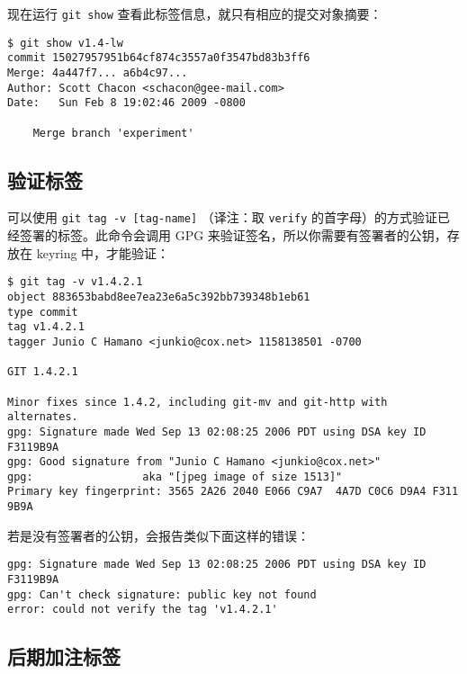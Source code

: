 \documentclass[a4paper]{book}
\begin{document}
现在运行 \texttt{git show} 查看此标签信息，就只有相应的提交对象摘要：

\begin{shaded}\begin{verbatim}
$ git show v1.4-lw
commit 15027957951b64cf874c3557a0f3547bd83b3ff6
Merge: 4a447f7... a6b4c97...
Author: Scott Chacon <schacon@gee-mail.com>
Date:   Sun Feb 8 19:02:46 2009 -0800

    Merge branch 'experiment'
\end{verbatim}\end{shaded}

\subsection{验证标签}

可以使用 \texttt{git tag -v {[}tag-name{]}} （译注：取 \texttt{verify} 的首字母）的方式验证已经签署的标签。此命令会调用 GPG 来验证签名，所以你需要有签署者的公钥，存放在 keyring 中，才能验证：

\begin{shaded}\begin{verbatim}
$ git tag -v v1.4.2.1
object 883653babd8ee7ea23e6a5c392bb739348b1eb61
type commit
tag v1.4.2.1
tagger Junio C Hamano <junkio@cox.net> 1158138501 -0700

GIT 1.4.2.1

Minor fixes since 1.4.2, including git-mv and git-http with alternates.
gpg: Signature made Wed Sep 13 02:08:25 2006 PDT using DSA key ID F3119B9A
gpg: Good signature from "Junio C Hamano <junkio@cox.net>"
gpg:                 aka "[jpeg image of size 1513]"
Primary key fingerprint: 3565 2A26 2040 E066 C9A7  4A7D C0C6 D9A4 F311 9B9A
\end{verbatim}\end{shaded}

若是没有签署者的公钥，会报告类似下面这样的错误：

\begin{shaded}\begin{verbatim}
gpg: Signature made Wed Sep 13 02:08:25 2006 PDT using DSA key ID F3119B9A
gpg: Can't check signature: public key not found
error: could not verify the tag 'v1.4.2.1'
\end{verbatim}\end{shaded}

\subsection{后期加注标签}
\end{document}
